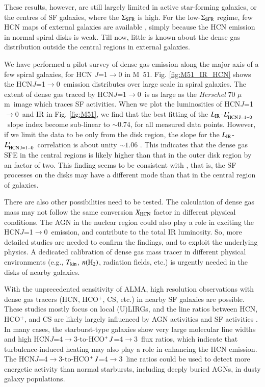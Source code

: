 \documentclass[legal,11pt]{article}
\def\,{\thinspace}
\def\Tkin{$T_{\rm kin}$}
\def\to{$\rightarrow$}
\def\mum{$\mu$m}
\def\nHtwo{$n({\rm H}_2)$}
\def\LIR     {$L_{\rm IR}$}
\def\LHCNoz  {$L'_{\rm HCN\, J=1-0}$}
\def\HCOP       {HCO$^{+}$}
\def\HCNoz      {HCN\,$J$=1$\rightarrow$0}
\def\HCNft        {HCN\,$J$=4$\rightarrow$3}
\def\HCOPft     {HCO$^+\,J$=4$\rightarrow$3}
\begin{document}
These results, however, are still largely limited in active star-forming
galaxies, or the centres of SF galaxies, where the $\Sigma_{\rm SFR}$ is high.
For the low-$\Sigma_{\rm SFR}$ regime, few HCN maps of external galaxies are
available \citep[e.g.,][]{Nguyen1992,gs04a,Kepley2014}, simply because the HCN
emission in normal spiral disks is weak. Till now, little is known about the
dense gas distribution outside the central regions in external galaxies. 

We have performed a  pilot survey of dense gas emission along the major axis of
a few spiral galaxies, for HCN $J$=1\to0 in M~51. Fig. \ref{fig:M51_IR_HCN}
shows the \HCNoz\ emission distributes over large scale in spiral galaxies. The
extent of dense gas traced by \HCNoz\ is as large as the {\it Herschel} 70 \mum\
image which traces SF activities.  When we plot the luminosities of \HCNoz\ and
IR in Fig. \ref{fig:M51}, we find that the best fitting of the \LIR-\LHCNoz\
slope index become sub-linear to $\sim$0.74, for all measured data points.
However, if we limit the data to be only from the disk region, the slope for
the \LIR-\LHCNoz\ correlation is about unity $\sim 1.06$ \citep{Chen15}. This
indicates that the dense gas SFE in the central regions is likely higher than
that in the outer disk region by an factor of two. This finding seems to be
consistent with \citep{usero15}, that is, the SF processes on the disks may
have a different mode than that in the central region of galaxies.


There are also other possibilities need to be tested. The calculation of
dense gas mass may not follow the same conversion $X_{\rm HCN}$ factor in
different physical conditions. The AGN in the nuclear region could also play a
role in exciting the \HCNoz\ emission, and contribute to the total IR
luminosity.  So, more detailed studies are needed to confirm the findings, and
to exploit the underlying physics. A dedicated calibration of dense gas mass
tracer in different physical environments (e.g., \Tkin, \nHtwo, radiation
fields, etc.) is urgently needed in the disks of nearby galaxies.





With the unprecedented sensitivity of ALMA, high resolution observations with
dense gas tracers (HCN, \HCOP, CS, etc.) in nearby SF galaxies are possible.
These studies mostly focus on local (U)LIRGs, and the line ratios between HCN,
\HCOP, and CS are likely largely influenced  by AGN activities
\citep[e.g.,][]{Izumi2013,Martin2015,GB2014, Imanishi2014} and SF activities
\citep[e.g.,][]{Meier2015}. In many cases, the starburst-type galaxies show
very large molecular line widths and high \HCNft-to-\HCOPft\ flux ratios, which
indicate that turbulence-induced heating may also play a role in enhancing the
HCN emission. The \HCNft-to-\HCOPft\ line ratios could be used to detect more
energetic activity than normal starbursts, including deeply buried AGNs, in
dusty galaxy populations\citep[e.g.,][]{Imanishi2014}.  
\end{document}
